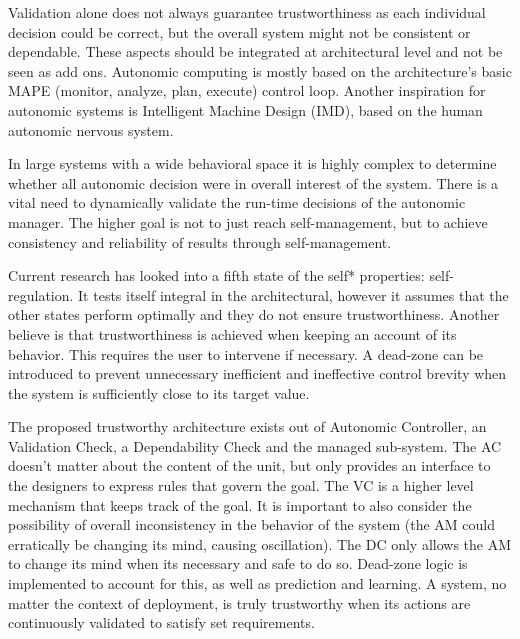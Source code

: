 
Validation alone does not always guarantee trustworthiness as each individual decision could be correct, but the overall system might not be consistent or dependable. These aspects should be integrated at architectural level and not be seen as add ons. Autonomic computing is mostly based on the architecture's basic MAPE (monitor, analyze, plan, execute) control loop. Another inspiration for autonomic systems is Intelligent Machine Design (IMD), based on the human autonomic nervous system.

In large systems with a wide behavioral space it is highly complex to determine whether all autonomic decision were in overall interest of the system. There is a vital need to dynamically validate the run-time decisions of the autonomic manager. The higher goal is not to just reach self-management, but to achieve consistency and reliability of results through self-management.

Current research has looked into a fifth state of the self* properties: self-regulation. It tests itself integral in the architectural, however it assumes that the other states perform optimally and they do not ensure trustworthiness. Another believe is that trustworthiness is achieved when keeping an account of its behavior. This requires the user to intervene if necessary. A dead-zone can be introduced to prevent unnecessary inefficient and ineffective control brevity when the system is sufficiently close to its target value.

The proposed trustworthy architecture exists out of  Autonomic Controller, an Validation Check, a Dependability Check and the managed sub-system. The AC doesn't matter about the content of the unit, but only provides an interface to the designers to express rules that govern the goal. The VC is a higher level mechanism that keeps track of the goal. It is important to also consider the possibility of overall inconsistency in the behavior of the system (the AM could erratically be changing its mind, causing oscillation). The DC only allows the AM to change its mind when its necessary and safe to do so.  Dead-zone logic is implemented to account for this, as well as prediction and learning. A system, no matter the context of deployment, is truly trustworthy when its actions are continuously validated to satisfy set requirements.
